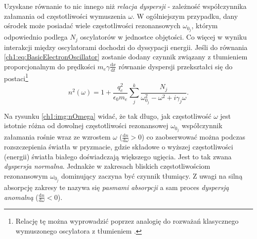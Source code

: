 Uzyskane równanie to nic innego niż \textit{relacja dyspersji} - zależność współczynnika załamania od częstotliwości wymuszenia $\omega$. W ogólniejszym przypadku, dany ośrodek może posiadać wiele częstotliwości rezonansowych $\omega_{0_j}$, którym odpowiednio podlega $N_j$ oscylatorów w jednostce objętości. Co więcej w wyniku interakcji między oscylatorami dochodzi do dyssypacji energii. Jeśli do równania \eqref{ch1:eq:BasicElectronOscillator} zostanie dodany czynnik związany z tłumieniem proporcjonalnym do prędkości $m_e\gamma\frac{\mathrm{d}x}{\mathrm{d}t}$ równanie dyspersji przekształci się do postaci\footnote{Relację tę można wyprowadzić poprzez analogię do rozważań klasycznego wymuszonego oscylatora z tłumieniem \cite{RUBINOWICZ_KROLIKOWSKI}.}
\begin{equation}
n^2(\omega) = 1 + \frac{q_e^2}{\epsilon_0m_e}\sum_j^k\frac{N_j}{\omega_{0_j}^2 - \omega^2 + i\gamma_j\omega}.
\label{ch1:eq:GeneralRefractionCoeff}
\end{equation}

Na rysunku \ref{ch1:img:nOmega} widać, że tak długo, jak częstotliwość $\omega$ jest istotnie różna od dowolnej częstotliwości rezonansowej $\omega_{0_j}$ współczynnik załamania rośnie wraz ze wzrostem $\omega$ ($\frac{\mathrm{d}n}{\mathrm{d}\omega} > 0$) co zaobserwować można podczas rozszczepienia światła w pryzmacie, gdzie składowe o wyższej częstotliwości (energii) światła białego doświadczają większego ugięcia. Jest to tak zwana \textit{dyspersja normalna}. Jednakże w zakresach bliskich częstotliwościom rezonansowym $\omega_{0_j}$ dominujący zaczyna być czynnik tłumiący. Z uwagi na silną absorpcję zakresy te nazywa się \textit{pasmami absorpcji} a sam proces \textit{dyspersją anomalną} ($\frac{\mathrm{d}n}{\mathrm{d}\omega} < 0$).

